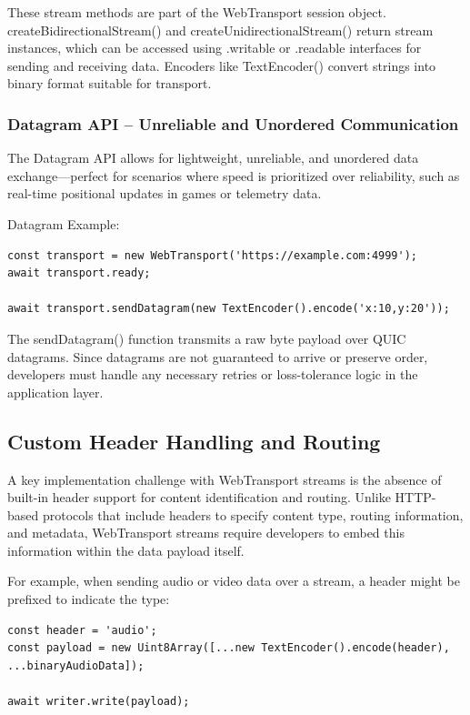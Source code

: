 These stream methods are part of the WebTransport session object. createBidirectionalStream() and createUnidirectionalStream() return stream instances, which can be accessed using .writable or .readable interfaces for sending and receiving data. Encoders like TextEncoder() convert strings into binary format suitable for transport.

\subsubsection{Datagram API – Unreliable and Unordered Communication}

The Datagram API allows for lightweight, unreliable, and unordered data exchange—perfect for scenarios where speed is prioritized over reliability, such as real-time positional updates in games or telemetry data.

Datagram Example:

\begin{lstlisting}[breaklines=true,basicstyle=\small\ttfamily,frame=single]
const transport = new WebTransport('https://example.com:4999');
await transport.ready;

await transport.sendDatagram(new TextEncoder().encode('x:10,y:20'));
\end{lstlisting}

The sendDatagram() function transmits a raw byte payload over QUIC datagrams. Since datagrams are not guaranteed to arrive or preserve order, developers must handle any necessary retries or loss-tolerance logic in the application layer.

\subsection{Custom Header Handling and Routing}

A key implementation challenge with WebTransport streams is the absence of built-in header support for content identification and routing. Unlike HTTP-based protocols that include headers to specify content type, routing information, and metadata, WebTransport streams require developers to embed this information within the data payload itself.

For example, when sending audio or video data over a stream, a header might be prefixed to indicate the type:

\begin{lstlisting}[breaklines=true,basicstyle=\small\ttfamily,frame=single]
const header = 'audio';
const payload = new Uint8Array([...new TextEncoder().encode(header), ...binaryAudioData]);

await writer.write(payload);
\end{lstlisting}

